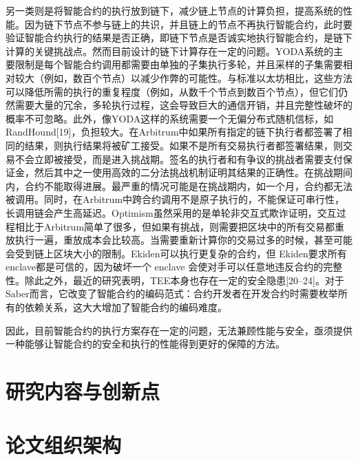 另一类则是将智能合约的执行放到链下，减少链上节点的计算负担，提高系统的性能。因为链下节点不参与链上的共识，并且链上的节点不再执行智能合约，此时要验证智能合约执行的结果是否正确，即链下节点是否诚实地执行智能合约，是链下计算的关键挑战点。然而目前设计的链下计算存在一定的问题。YODA系统的主要限制是每个智能合约调用都需要由单独的子集执行多轮，并且采样的子集需要相对较大（例如，数百个节点）以减少作弊的可能性。与标准以太坊相比，这些方法可以降低所需的执行的重复程度（例如，从数千个节点到数百个节点），但它们仍然需要大量的冗余，多轮执行过程，这会导致巨大的通信开销，并且完整性破坏的概率不可忽略。此外，像YODA这样的系统需要一个无偏分布式随机信标，如 RandHound[19]，负担较大。在Arbitrum中如果所有指定的链下执行者都签署了相同的结果，则执行结果将被矿工接受。如果不是所有交易执行者都签署结果，则交易不会立即被接受，而是进入挑战期。签名的执行者和有争议的挑战者需要支付保证金，然后其中之一使用高效的二分法挑战机制证明其结果的正确性。在挑战期间内，合约不能取得进展。最严重的情况可能是在挑战期内，如一个月，合约都无法被调用。同时，在Arbitrum中跨合约调用不是原子执行的，不能保证可串行性，长调用链会产生高延迟。Optimism虽然采用的是单轮非交互式欺诈证明，交互过程相比于Arbitrum简单了很多，但如果有挑战，则需要把区块中的所有交易都重放执行一遍，重放成本会比较高。当需要重新计算你的交易过多的时候，甚至可能会受到链上区块大小的限制。Ekiden可以执行更复杂的合约，但 Ekiden要求所有enclave都是可信的，因为破坏一个 enclave 会使对手可以任意地违反合约的完整性。除此之外，最近的研究表明，TEE本身也存在一定的安全隐患[20–24]。对于Saber而言，它改变了智能合约的编码范式：合约开发者在开发合约时需要枚举所有的依赖关系，这大大增加了智能合约的编码难度。

因此，目前智能合约的执行方案存在一定的问题，无法兼顾性能与安全，亟须提供一种能够让智能合约的安全和执行的性能得到更好的保障的方法。
\section{研究内容与创新点}


\section{论文组织架构}


